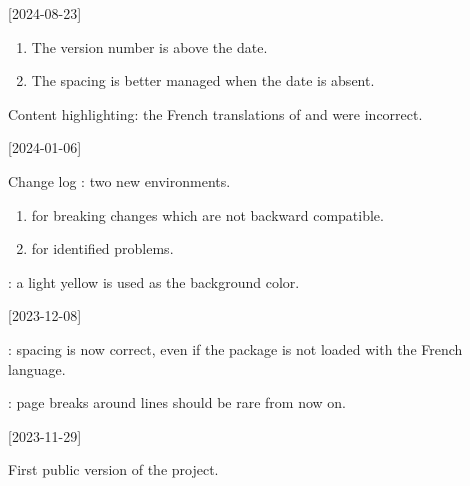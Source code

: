 [2024-08-23]

\begin{tdocupdate}
	\item {}
    \begin{enumerate}
		\item The version number is above the date.

		\item The spacing is better managed when the date is absent.
    \end{enumerate}
\end{tdocupdate}


\begin{tdocfix}
	\item Content highlighting: the French translations of  and  were incorrect.
\end{tdocfix}

\tdocsep

[2024-01-06]

\begin{tdocnew}
	\item Change log : two new environments.
    \begin{enumerate}
        \item {} for breaking changes which are not backward compatible.

        \item {} for identified problems.
    \end{enumerate}

	\item {}: a light yellow is used as the background color.
\end{tdocnew}

\tdocsep

[2023-12-08]

\begin{tdocfix}
	\item {}: spacing is now correct, even if the  package is not loaded with the French language.

	\item {}: page breaks around  lines should be rare from now on.
\end{tdocfix}

\tdocsep

[2023-11-29]

First public version of the project.
